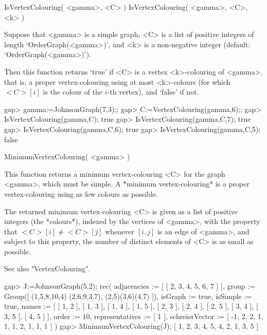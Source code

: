 
\>IsVertexColouring( <gamma>, <C> )
\>IsVertexColouring( <gamma>, <C>, <k> )

Suppose that <gamma> is a simple graph, <C> is a list of positive integers
of length `OrderGraph(<gamma>)', and <k> is a non-negative integer
(default: `OrderGraph(<gamma>)').

Then this function returns `true' if <C> is a vertex <k>-colouring of
<gamma>, that is, a proper vertex-colouring using at most <k>-colours (for
which $<C>[i]$ is the colour of the $i$-th vertex), and `false' if not.

\beginexample
gap> gamma:=JohnsonGraph(7,3);;
gap> C:=VertexColouring(gamma,6);;
gap> IsVertexColouring(gamma,C);
true
gap> IsVertexColouring(gamma,C,7);
true
gap> IsVertexColouring(gamma,C,6);
true
gap> IsVertexColouring(gamma,C,5);
false
\endexample


\>MinimumVertexColouring( <gamma> )

This function returns a minimum vertex-colouring <C> for the graph
<gamma>, which must be simple. A *minimum vertex-colouring*
is a proper vertex-colouring using as few colours as possible.

The returned minimum vertex-colouring <C> is given as a list of positive
integers (the *colours*), indexed by the vertices of <gamma>, with the
property that $<C>[i]\not=<C>[j]$ whenever $[i,j]$ is an edge of <gamma>,
and subject to this property, the number of distinct elements of <C>
is as small as possible.

See also "VertexColouring".

\beginexample
gap> J:=JohnsonGraph(5,2);
rec( adjacencies := [ [ 2, 3, 4, 5, 6, 7 ] ], group := Group([ (1,5,8,10,4)
  (2,6,9,3,7), (2,5)(3,6)(4,7) ]), isGraph := true, isSimple := true, 
  names := [ [ 1, 2 ], [ 1, 3 ], [ 1, 4 ], [ 1, 5 ], [ 2, 3 ], [ 2, 4 ], 
      [ 2, 5 ], [ 3, 4 ], [ 3, 5 ], [ 4, 5 ] ], order := 10, 
  representatives := [ 1 ], schreierVector := [ -1, 2, 2, 1, 1, 1, 2, 1, 1, 1 
     ] )
gap> MinimumVertexColouring(J);
[ 1, 2, 3, 4, 5, 4, 2, 1, 3, 5 ]
\endexample


